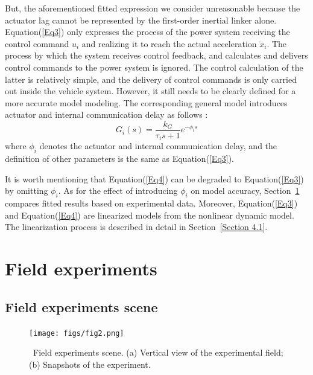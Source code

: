 \documentclass[journal]{IEEEtran}
\begin{document}
But, the aforementioned fitted expression we consider unreasonable because the actuator lag cannot be represented by the first-order inertial linker alone. Equation(\ref{Eq3}) only expresses the process of the power system receiving the control command $u_i$ and realizing it to reach the actual acceleration ${\ddot{x}}_i$. The process by which the system receives control feedback, and calculates and delivers control commands to the power system is ignored. The control calculation of the latter is relatively simple, and the delivery of control commands is only carried out inside the vehicle system. However, it still needs to be clearly defined for a more accurate model modeling. The corresponding general model introduces actuator and internal communication delay as follows \citep{Naus2010}:
\begin{equation}
  G_i(s)=\frac{k_G}{\tau_is+1}e^{-\phi_is}
  \label{Eq4}
\end{equation}
where $\phi_i$ denotes the actuator and internal communication delay, and the definition of other parameters is the same as Equation(\ref{Eq3}).

It is worth mentioning that Equation(\ref{Eq4}) can be degraded to Equation(\ref{Eq3}) by omitting $\phi_i$. As for the effect of introducing $\phi_i$ on model accuracy, Section~\ref{Section 3} compares fitted results based on experimental data. Moreover, Equation(\ref{Eq3}) and Equation(\ref{Eq4}) are linearized models from the nonlinear dynamic model. The linearization process is described in detail in Section~\ref{Section 4.1}.



\section{Field experiments}
\label{Section 3}

\subsection{Field experiments scene}
\label{Section 3.1}

\begin{figure}
  \centering
  \texttt{[image: figs/fig2.png]}
  \caption{~Field experiments scene. (a) Vertical view of the experimental field; (b) Snapshots of the experiment.}
  \label{fig2}
\end{figure}
\end{document}
